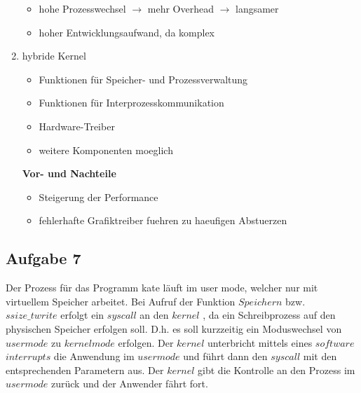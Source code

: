 \begin{enumerate}
\begin{minipage}[t]{0.45\textwidth}
        \end{minipage}
        \hfill
        \begin{minipage}[t]{0.45\textwidth}
        \begin{itemize}[label=\ensuremath{-}]
        \item hohe Prozesswechsel $ \rightarrow $ mehr Overhead $ \rightarrow $ langsamer
        \item hoher Entwicklungsaufwand, da komplex
        \end{itemize}
      \end{minipage}
  \item hybride Kernel
    \begin{itemize}
        \item Funktionen für Speicher- und Prozessverwaltung
        \item Funktionen für Interprozesskommunikation
        \item Hardware-Treiber
        \item weitere Komponenten moeglich
      \end{itemize}
      \textbf{Vor- und Nachteile}\\
      \begin{minipage}[t]{0.45\textwidth}
        \begin{itemize}[label=\ensuremath{+}]
        \item Steigerung der Performance
        \end{itemize}
        \end{minipage}
        \hfill
        \begin{minipage}[t]{0.45\textwidth}
        \begin{itemize}[label=\ensuremath{-}]
        \item fehlerhafte Grafiktreiber fuehren zu haeufigen Abstuerzen
        \end{itemize}
      \end{minipage}
\end{enumerate}

\subsection*{Aufgabe 7}

Der Prozess für das Programm kate läuft im user mode, welcher nur mit virtuellem Speicher arbeitet. Bei Aufruf der Funktion $ Speichern $ bzw. $ ssize \_ twrite $ erfolgt ein $ syscall $ an den $ kernel $ , da ein Schreibprozess auf den physischen Speicher erfolgen soll. D.h. es soll kurzzeitig ein Moduswechsel von $ user mode $ zu $ kernel mode $ erfolgen. Der $ kernel $ unterbricht mittels eines $ software $ $ interrupts $ die Anwendung im $ user mode $ und führt dann den $ syscall $ mit den entsprechenden Parametern aus. Der $ kernel $ gibt die Kontrolle an den Prozess im $ user mode $ zurück und der Anwender fährt fort.


